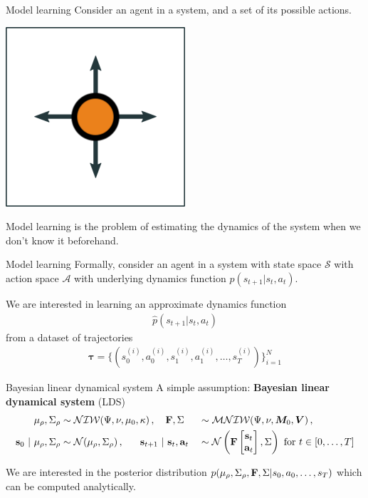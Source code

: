 \documentclass[10pt, compress]{beamer}
\begin{document}
\begin{frame}{Model learning}
	Consider an agent in a system,
	and a set of its possible actions.
	\begin{center}
		\includegraphics[width=0.5\textwidth]{img/agent-env-1.png}
	\end{center}
	\pause
	Model learning is the problem of estimating the dynamics of the system
	when we don't know it beforehand.
\end{frame}

\begin{frame}{Model learning}
	Formally, consider an agent in a system with state space $\mathcal{S}$
	with action space $\mathcal{A}$ with underlying dynamics 
	function $p(s_{t + 1} | s_t, a_t)$.

	We are interested in learning an approximate dynamics function
	\begin{align*}\hat{p}(s_{t + 1} | s_t, a_t)\end{align*}
		from a dataset of trajectories \begin{align*}\bm{\tau} = \{(s^{(i)}_0, a^{(i)}_0, s^{(i)}_1, a^{(i)}_1, \ldots, s^{(i)}_T)\}_{i = 1}^N\end{align*}
\end{frame}

\begin{frame}{Bayesian linear dynamical system}
	A simple assumption: \textbf{Bayesian linear dynamical system} (LDS)
	\begin{alignat*}{3}
		\mu_{\rho},\Sigma_{\rho}&\sim\mathcal{NIW}(\Psi,\nu,\mu_0,\kappa)\,,~~~\mathbf{F},\Sigma&&\sim\mathcal{MNIW}(\Psi,\nu,\bm{M}_0,\bm{V})\,,\\
		\mathbf{s}_0~|~\mu_{\rho},\Sigma_{\rho}&\sim\mathcal{N}(\mu_{\rho}, \Sigma_{\rho})\,,~~~~~\mathbf{s}_{t+1}~|~\mathbf{s}_t,\mathbf{a}_t&&\sim\mathcal{N}\left(\mathbf{F}\begin{bmatrix}\mathbf{s}_t\\\mathbf{a}_t\end{bmatrix},\Sigma\right) \textrm{ for } t \in [0,\ldots,T]
	\end{alignat*}
	\pause
	\centering
	

	\pause
	We are interested in the posterior distribution 
	$
	p(\mu_\rho, \Sigma_\rho, \mathbf{F}, \Sigma | {s_0, a_0, \ldots, s_T})
	$
	which can be computed analytically.
\end{frame}
\end{document}
